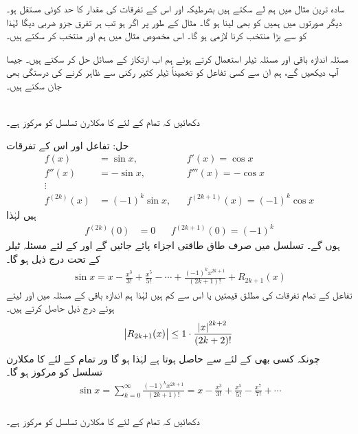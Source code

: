 سادہ ترین مثال میں ہم  لے سکتے ہیں بشرطیکہ  اور اس کے تفرقات کی مقدار کا حد کوئی مستقل  ہو۔ دیگر صورتوں میں ہمیں  کو بھی لینا ہو گا۔ مثال کے طور پر اگر  ہو تب ہر تفرق جزو ضربی  دیگا لہٰذا  کو  سے بڑا منتخب کرنا لازمی ہو گا۔ اس مخصوص مثال میں ہم  اور  منتخب کر سکتے ہیں۔

مسئلہ اندازہ باقی اور  مسئلہ ٹیلر استعمال کرتے ہوئے ہم اب ارتکاز کے مسائل حل کر سکتے ہیں۔ جیسا آپ دیکھیں گے، ہم ان سے کسی تفاعل کو تخمیناً ٹیلر کثیر رکنی سے ظاہر کرنے کی درستگی بھی جان سکتے ہیں۔

\\
دکھائیں کہ تمام  کے لئے  کا مکلارن تسلسل  کو مرکوز ہے۔

حل:\quad
تفاعل اور اس کے تفرقات
\begin{align*}
f(x)&=\sin x,&&f'(x)=\cos x\\
f''(x)&=-\sin x,&&f'''(x)=-\cos x\\
\vdots&\\
f^{(2k)}(x)&=(-1)^k\sin x,&&f^{(2k+1)}(x)=(-1)^k\cos x
\end{align*}
ہیں لہٰذا
\begin{align*}
f^{(2k)}(0)&=0&&f^{(2k+1)}(0)=(-1)^k
\end{align*}
ہوں گے۔ تسلسل میں صرف طاق طاقتی اجزاء پائے جائیں گے اور  کے لئے مسئلہ ٹیلر کے تحت درج ذیل ہو گا۔
\begin{align*}
\sin x=x-\frac{x^3}{3!}+\frac{x^5}{5!}-\cdots+\frac{(-1)^kx^{2k+1}}{(2k+1)!}+R_{2k+1}(x)
\end{align*}
تفاعل  کے تمام تفرقات کی مطلق قیمتیں  یا اس سے کم ہیں لہٰذا ہم اندازہ باقی کے مسئلہ میں  اور  لیتے ہوئے درج ذیل حاصل کرتے ہیں۔
\begin{align*}
\abs{R_{2k+1}(x)}\le 1\cdot\frac{\abs{x}^{2k+2}}{(2k+2)!}
\end{align*} 
چونکہ کسی بھی  کے لئے  سے  حاصل ہوتا ہے لہٰذا  ہو گا ور تمام  کے لئے  کا مکلارن تسلسل  کو مرکوز ہو گا۔
\begin{align}
\sin x=\sum_{k=0}^{\infty}\frac{(-1)^kx^{2k+1}}{(2k+1)!}=x-\frac{x^3}{3!}+\frac{x^5}{5!}-\frac{x^7}{7!}+\cdots
\end{align}
\\
دکھائیں کہ تمام  کے لئے  کا مکلارن تسلسل  کو مرکوز ہے۔

